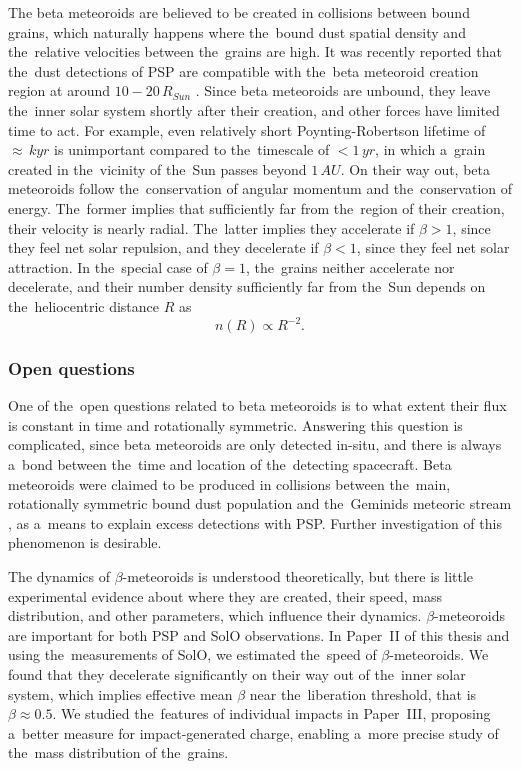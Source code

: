 The beta meteoroids are believed to be created in collisions between bound grains, which naturally happens where the~bound dust spatial density and the~relative velocities between the~grains are high. It was recently reported that the~dust detections of PSP are compatible with the~beta meteoroid creation region at around $10 - 20 \, R_{Sun}$ \citep{szalay2021collisional}. Since beta meteoroids are unbound, they leave the~inner solar system shortly after their creation, and other forces have limited time to act. For example, even relatively short Poynting-Robertson lifetime of $\approx \, kyr$ is unimportant compared to the~timescale of $< 1 \, \si{yr}$, in which a~grain created in the~vicinity of the~Sun passes beyond $1 \, \si{AU}$. On their way out, beta meteoroids follow the~conservation of angular momentum and the~conservation of energy. The~former implies that sufficiently far from the~region of their creation, their velocity is nearly radial. The~latter implies they accelerate if $\beta > 1$, since they feel net solar repulsion, and they decelerate if $\beta < 1$, since they feel net solar attraction. In the~special case of $\beta=1$, the~grains neither accelerate nor decelerate, and their number density sufficiently far from the~Sun depends on the~heliocentric distance $R$ as
\begin{equation}
    n(R) \propto R^{-2}. \label{eq:beta_number_density}
\end{equation} 

\subsubsection{Open questions}

One of the~open questions related to beta meteoroids is to what extent their flux is constant in time and rotationally symmetric. Answering this question is complicated, since beta meteoroids are only detected in-situ, and there is always a~bond between the~time and location of the~detecting spacecraft. Beta meteoroids were claimed to be produced in collisions between the~main, rotationally symmetric bound dust population and the~{Geminids} meteoric stream \citep{szalay2021collisional}, as a~means to explain excess detections with PSP. Further investigation of this phenomenon is desirable.

The dynamics of $\beta$-meteoroids is understood theoretically, but there is little experimental evidence about where they are created, their speed, mass distribution, and other parameters, which influence their dynamics. $\beta$-meteoroids are important for both PSP and SolO observations. In Paper~II of this thesis and using the~measurements of SolO, we estimated the~speed of $\beta$-meteoroids. We found that they decelerate significantly on their way out of the~inner solar system, which implies effective mean $\beta$ near the~liberation threshold, that is $\beta \approx 0.5$. We studied the~features of individual impacts in Paper~III, proposing a~better measure for impact-generated charge, enabling a~more precise study of the~mass distribution of the~grains. 

